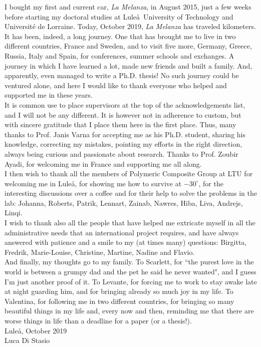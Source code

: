 I bought my first and current car, \emph{La Melanza}, in August 2015, just a few weeks before starting my doctoral studies at Lule\aa\ University of Technology and Universit\'e de Lorraine. Today, October 2019, \emph{La Melanza} has traveled kilometers. It has been, indeed, a long journey. One that has brought me to live in two different countries, France and Sweden, and to visit five more, Germany, Greece, Russia, Italy and Spain, for conferences, summer schools and exchanges. A journey in which I have learned a lot, made new friends and built a family. And, apparently, even managed to write a Ph.D. thesis! No such journey could be ventured alone, and here I would like to thank everyone who helped and supported me in these years.\\
It is common use to place supervisors at the top of the acknowledgements list, and I will not be any different. It is however not in adherence to custom, but with sincere gratitude that I place them here in the first place. Thus, many thanks to Prof. Janis Varna for accepting me as his Ph.D. student, sharing his knowledge, correcting my mistakes, pointing my efforts in the right direction, always being curious and passionate about research. Thanks to Prof. Zoubir Ayadi, for welcoming me in France and supporting me all along.\\
I then wish to thank all the members of Polymeric Composite Group at LTU for welcoming me in Lule\aa, for showing me how to survive at $-30^{\circ}$, for the interesting discussions over a coffee and for their help to solve the problems in the lab: Johanna, Roberts, Patrik, Lennart, Zainab, Nawres, Hiba, Liva, Andrejs, Linqi.\\
I wish to thank also all the people that have helped me extricate myself in all the administrative needs that an international project requires, and have always answered with patience and a smile to my (at times many) questions: Birgitta, Fredrik, Marie-Louise, Christine, Martine, Nadine and Flavio.\\
And finally, my thoughts go to my family. To Scarlett, for ``the purest love in the world is between a grumpy dad and the pet he said he never wanted", and I guess I'm just another proof of it. To Levante, for forcing me to work to stay awake late at night guarding him, and for bringing already so much joy in my life. To Valentina, for following me in two different countries, for bringing so many beautiful things in my life and, every now and then, reminding me that there are worse things in life than a deadline for a paper (or a thesis!).\\

\noindent Lule\aa, October 2019\\
Luca Di Stasio
